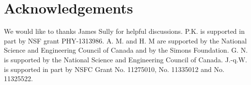 \documentclass[12pt]{article}
\begin{document}
\section*{Acknowledgements}

  We would like to thanks James Sully for helpful discussions. P.K. is supported in part by NSF grant PHY-1313986.  A. M. and H. M are supported by the National Science and Engineering Council of Canada and by the Simons Foundation.  G. N. is supported by the National Science and Engineering Council of Canada. J.-q.W. is supported in part by NSFC Grant No. 11275010, No. 11335012 and No. 11325522.


 
\end{document}
